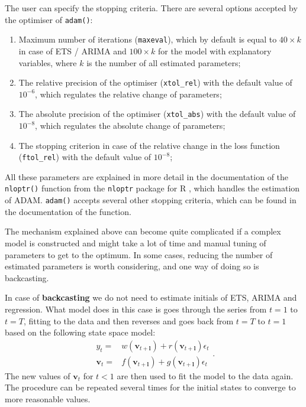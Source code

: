 \documentclass[
]{book}
\providecommand{\tightlist}{%
  \setlength{\itemsep}{0pt}\setlength{\parskip}{0pt}}
\theoremstyle{definition}
\theoremstyle{definition}
\theoremstyle{definition}
\theoremstyle{definition}
\theoremstyle{remark}
\begin{document}
The user can specify the stopping criteria. There are several options accepted by the optimiser of \texttt{adam()}:

\begin{enumerate}
\def\labelenumi{\arabic{enumi}.}
\tightlist
\item
  Maximum number of iterations (\texttt{maxeval}), which by default is equal to \(40\times k\) in case of ETS / ARIMA and \(100 \times k\) for the model with explanatory variables, where \(k\) is the number of all estimated parameters;
\item
  The relative precision of the optimiser (\texttt{xtol\_rel}) with the default value of \(10^{-6}\), which regulates the relative change of parameters;
\item
  The absolute precision of the optimiser (\texttt{xtol\_abs}) with the default value of \(10^{-8}\), which regulates the absolute change of parameters;
\item
  The stopping criterion in case of the relative change in the loss function (\texttt{ftol\_rel}) with the default value of \(10^{-8}\);
\end{enumerate}

All these parameters are explained in more detail in the documentation of the \texttt{nloptr()} function from the \texttt{nloptr} package for R \citep{nlopt}, which handles the estimation of ADAM. \texttt{adam()} accepts several other stopping criteria, which can be found in the documentation of the function.

The mechanism explained above can become quite complicated if a complex model is constructed and might take a lot of time and manual tuning of parameters to get to the optimum. In some cases, reducing the number of estimated parameters is worth considering, and one way of doing so is backcasting.

In case of \textbf{backcasting} we do not need to estimate initials of ETS, ARIMA and regression. What model does in this case is goes through the series from \(t=1\) to \(t=T\), fitting to the data and then reverses and goes back from \(t=T\) to \(t=1\) based on the following state space model:
\begin{equation}
  \begin{aligned}
  {y}_{t} = &w(\mathbf{v}_{t+\boldsymbol{l}}) + r(\mathbf{v}_{t+\mathbf{l}}) \epsilon_t \\
  \mathbf{v}_{t} = &f(\mathbf{v}_{t+\mathbf{l}}) + g(\mathbf{v}_{t+\mathbf{l}}) \epsilon_t
  \end{aligned}.
  \label{eq:ETSADAMStateSpaceBackwards}
\end{equation}
The new values of \(\mathbf{v}_t\) for \(t<1\) are then used to fit the model to the data again. The procedure can be repeated several times for the initial states to converge to more reasonable values.
\end{document}
